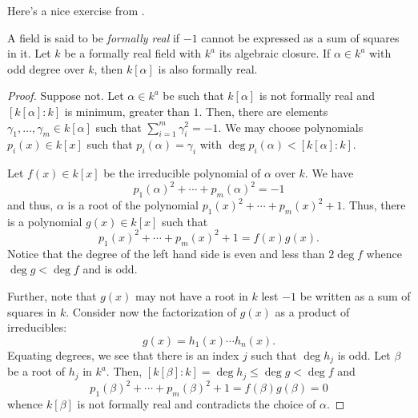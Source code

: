 Here's a nice exercise from \cite{DF04}.

\begin{example}
    A field is said to be \emph{formally real} if $-1$ cannot be expressed as a sum of squares in it. Let $k$ be a formally real field with $k^a$ its algebraic closure. If $\alpha\in k^a$ with odd degree over $k$, then $k[\alpha]$ is also formally real.
\end{example}
\begin{proof}
    Suppose not. Let $\alpha\in k^a$ be such that $k[\alpha]$ is not formally real and $[k[\alpha]:k]$ is minimum, greater than $1$. Then, there are elements $\gamma_1,\dots,\gamma_m\in k[\alpha]$ such that $\sum_{i = 1}^m\gamma_i^2 = -1$. We may choose polynomials $p_i(x)\in k[x]$ such that $p_i(\alpha) = \gamma_i$ with $\deg p_i(\alpha) < [k[\alpha]:k]$.

    Let $f(x)\in k[x]$ be the irreducible polynomial of $\alpha$ over $k$. We have 
    \begin{equation*}
        p_1(\alpha)^2 + \cdots + p_m(\alpha)^2 = -1
    \end{equation*}
    and thus, $\alpha$ is a root of the polynomial $p_1(x)^2 + \cdots + p_m(x)^2 + 1$. Thus, there is a polynomial $g(x)\in k[x]$ such that 
    \begin{equation*}
        p_1(x)^2 + \cdots + p_m(x)^2 + 1 = f(x)g(x).
    \end{equation*}
    Notice that the degree of the left hand side is even and less than $2\deg f$ whence $\deg g < \deg f$ and is odd.

    Further, note that $g(x)$ may not have a root in $k$ lest $-1$ be written as a sum of squares in $k$. Consider now the factorization of $g(x)$ as a product of irreducibles: 
    \begin{equation*}
        g(x) = h_1(x)\cdots h_n(x).
    \end{equation*}
    Equating degrees, we see that there is an index $j$ such that $\deg h_j$ is odd. Let $\beta$ be a root of $h_j$ in $k^a$. Then, $[k[\beta]:k] = \deg h_j\le \deg g < \deg f$ and 
    \begin{equation*}
        p_1(\beta)^2 + \cdots + p_m(\beta)^2 + 1 = f(\beta)g(\beta) = 0
    \end{equation*}
    whence $k[\beta]$ is not formally real and contradicts the choice of $\alpha$.
\end{proof}